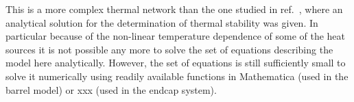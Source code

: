 This is a more complex thermal network than the one studied in ref.~\cite{Beck:2010zzd}, where an analytical solution for the determination of thermal stability was given. In particular because of the non-linear temperature dependence of some of the heat sources it is not possible any more to solve the set of equations describing the model here analytically. However, the set of equations is still sufficiently small to solve it numerically using readily available functions in Mathematica (used in the barrel model) or xxx (used in the endcap system).